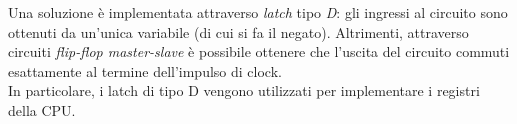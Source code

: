 \documentclass[class=book, crop=false, oneside]{standalone}
\begin{document}
Una soluzione è implementata attraverso \emph{latch} tipo \emph{D}: gli ingressi al circuito sono ottenuti da un'unica variabile (di cui si fa il negato). Altrimenti, attraverso circuiti \emph{flip-flop master-slave} è possibile ottenere che l’uscita del circuito commuti esattamente al termine dell’impulso di clock.\\
In particolare, i latch di tipo D vengono utilizzati per implementare i registri della CPU.
\end{document}
